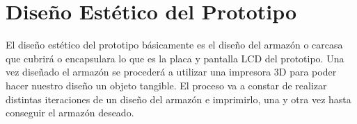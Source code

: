 \section{Diseño Estético del Prototipo}

\par 
El diseño estético del prototipo básicamente es el diseño del armazón o carcasa que cubrirá o encapsulara lo que es la placa y pantalla LCD del prototipo. Una vez diseñado el armazón se procederá a utilizar una impresora 3D para poder hacer nuestro diseño un objeto tangible. El proceso va a constar de realizar distintas iteraciones de un diseño del armazón e imprimirlo, una y otra vez hasta conseguir el armazón deseado. 







